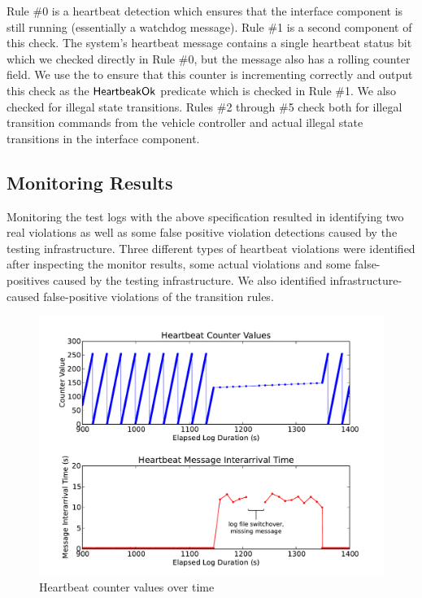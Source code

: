 Rule \#0 is a heartbeat detection which ensures that the interface component is still running (essentially a watchdog message). Rule \#1 is a second component of this check. The system's heartbeat message contains a single heartbeat status bit which we checked directly in Rule \#0, but the message also has a rolling counter field. We use the \sfmap to ensure that this counter is incrementing correctly and output this check as the $\mathsf{HeartbeakOk}$ predicate which is checked in Rule \#1.
We also checked for illegal state transitions. Rules \#2 through \#5 check both for illegal transition commands from the vehicle controller and actual illegal state transitions in the interface component.


\subsection{Monitoring Results}
Monitoring the test logs with the above specification resulted in identifying two real violations as well as some false positive violation detections caused by the testing infrastructure.
%
Three different types of heartbeat violations were identified after inspecting the monitor results, some actual violations and some false-positives caused by the testing infrastructure. We also identified infrastructure-caused false-positive violations of the transition rules.

\begin{figure}[t]
		\centering 
		\includegraphics[width=4.5in]{img/hb1}
		\caption{Heartbeat counter values over time}
		\label{fig:hb_arrival}
\end{figure}

